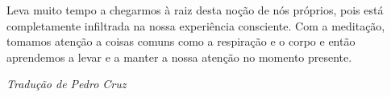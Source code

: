 Leva muito tempo a chegarmos à raiz desta noção de nós próprios, pois
está completamente infiltrada na nossa experiência consciente. Com a
meditação, tomamos atenção a coisas comuns como a respiração e o corpo e
então aprendemos a levar e a manter a nossa atenção no momento presente.

\bigskip

{\raggedleft\itshape
  Tradução de Pedro Cruz
\par}
